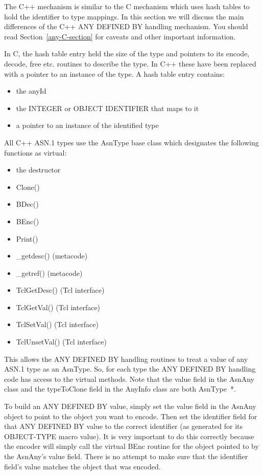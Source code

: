 The C++ mechanism is similar to the C mechanism which uses hash tables
to hold the identifier to type mappings.  In this section we will
discuss the main differences of the C++ ANY DEFINED BY handling
mechanism.  You should read Section~\ref{any-C-section} for caveats and
other important information.

In C, the hash table entry held the size of the type and pointers to
its encode, decode, free etc. routines to describe the type.  In C++
these have been replaced with a pointer to an instance of the type. A
hash table entry contains:
\begin{itemize}
\item {the {\C anyId}}
\item {the INTEGER or OBJECT IDENTIFIER that maps to it}
\item {a pointer to an instance of the identified type}
\end{itemize}

All C++ ASN.1 types use the {\C AsnType} base class which designates the following functions as virtual:
\begin{itemize}
  \item the destructor
  \item {\C Clone()}
  \item {\C BDec()}
  \item {\C BEnc()}
  \item {\C Print()}
  \item {\C \_getdesc()} (metacode)
  \item {\C \_getref()} (metacode)
  \item {\C TclGetDesc()} (Tcl interface)
  \item {\C TclGetVal()} (Tcl interface)
  \item {\C TclSetVal()} (Tcl interface)
  \item {\C TclUnsetVal()} (Tcl interface)
\end{itemize}

This allows the ANY DEFINED BY handling routines to treat a value of
any ASN.1 type as an {\C AsnType}.  So, for each type the ANY
DEFINED BY handling code has access to the virtual methods.  Note
that the {\C value} field in the {\C AsnAny} class and the
{\C typeToClone} field in the {\C AnyInfo} class are both
{\C AsnType~*}.

To build an ANY DEFINED BY value, simply set the value field in the
{\C AsnAny} object to point to the object you want to encode.  Then
set the identifier field for that ANY DEFINED BY value to the correct
identifier (as generated for its OBJECT-TYPE macro value).  It is very
important to do this correctly because the encoder will simply call
the virtual {\C BEnc} routine for the object pointed to by the
{\C AsnAny}'s value field.  There is no attempt to make sure that
the identifier field's value matches the object that was encoded.

